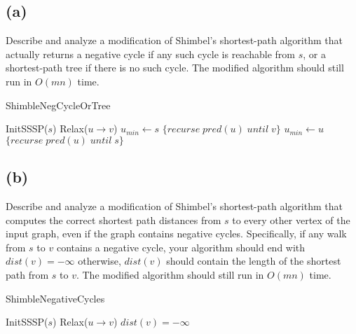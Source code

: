 \documentclass[12pt]{article}
\begin{document}
\subsection*{(a)}
Describe and analyze a modification of Shimbel's shortest-path algorithm
that actually returns a negative cycle if any such cycle is reachable
from $s$, or a shortest-path tree if there is no such cycle. The modified
algorithm should still run in $O(mn)$ time.

\begin{algorithm}
\caption{ShimbleNegCycleOrTree}
\begin{algorithmic}
    \STATE InitSSSP($s$)
                \STATE Relax($u \rightarrow v$)
            \ENDIF
        \ENDFOR
    \ENDFOR
    \STATE $u_{min} \leftarrow s$
            \RETURN $\{ recurse\; pred(u)\; until\; v \}$
        \ENDIF
            \STATE $u_{min} \leftarrow u$
        \ENDIF
        \RETURN $\{ recurse\; pred(u)\; until\; s \}$
    \ENDFOR
\end{algorithmic}
\end{algorithm}

\pagebreak

\subsection*{(b)}
Describe and analyze a modification of Shimbel's shortest-path
algorithm that computes the correct shortest path distances from $s$ to
every other vertex of the input graph, even if the graph contains
negative cycles. Specifically, if any walk from $s$ to $v$ contains a
negative cycle, your algorithm should end with $dist(v) = -\infty$
otherwise, $dist(v)$ should contain the length of the shortest path
from $s$ to $v$. The modified algorithm should still run in $O(mn)$
time.

\begin{algorithm}
\caption{ShimbleNegativeCycles}
\begin{algorithmic}
    \STATE InitSSSP($s$)
                \STATE Relax($u \rightarrow v$)
            \ENDIF
        \ENDFOR
    \ENDFOR
            \STATE $dist(v) = -\infty$
        \ENDIF
    \ENDFOR
\end{algorithmic}
\end{algorithm}
\end{document}
